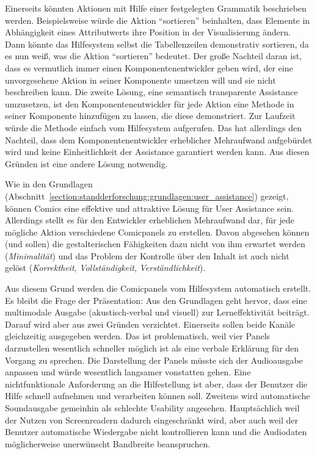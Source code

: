 \documentclass[
	headsepline,
	footsepline,
	fontsize=12pt,
	bibliography=totoc
]{scrbook}
\begin{document}
Einerseits könnten Aktionen mit Hilfe einer festgelegten Grammatik beschrieben werden. Beispielsweise würde die Aktion \enquote{sortieren} beinhalten, dass Elemente in Abhängigkeit eines Attributwerts ihre Position in der Visualisierung ändern. Dann könnte das Hilfesystem selbst die Tabellenzeilen demonstrativ sortieren, da es nun weiß, was die Aktion \enquote{sortieren} bedeutet. Der große Nachteil daran ist, dass es vermutlich immer einen Komponentenentwickler geben wird, der eine unvorgesehene Aktion in seiner Komponente umsetzen will und sie nicht beschreiben kann. Die zweite Lösung, eine semantisch transparente Assistance umzusetzen, ist den Komponentenentwickler für jede Aktion eine Methode in seiner Komponente hinzufügen zu lassen, die diese demonstriert. Zur Laufzeit würde die Methode einfach vom Hilfesystem aufgerufen. Das hat allerdings den Nachteil, dass dem Komponentenentwickler erheblicher Mehraufwand aufgebürdet wird und keine Einheitlichkeit der Assistance garantiert werden kann. Aus diesen Gründen ist eine andere Lösung notwendig.

Wie in den Grundlagen (Abschnitt~\ref{section:standderforschung:grundlagen:user_assistance}) gezeigt, können Comics eine effektive und attraktive Lösung für User Assistance sein. Allerdings stellt es für den Entwickler erheblichen Mehraufwand dar, für jede mögliche Aktion verschiedene Comicpanels zu erstellen. Davon abgesehen können (und sollen) die gestalterischen Fähigkeiten dazu nicht von ihm erwartet werden (\emph{Minimalität}) und das Problem der Kontrolle über den Inhalt ist auch nicht gelöst (\emph{Korrektheit}, \emph{Vollständigkeit}, \emph{Verständlichkeit}).

Aus diesem Grund werden die Comicpanels vom Hilfesystem automatisch erstellt. Es bleibt die Frage der Präsentation: Aus den Grundlagen geht hervor, dass eine multimodale Ausgabe (akustisch-verbal und visuell) zur Lerneffektivität beiträgt. Darauf wird aber aus zwei Gründen verzichtet. Einerseits sollen beide Kanäle gleichzeitig ausgegeben werden. Das ist problematisch, weil vier Panels darzustellen wesentlich schneller möglich ist als eine verbale Erklärung für den Vorgang zu sprechen. Die Darstellung der Panels müsste sich der Audioausgabe anpassen und würde wesentlich langsamer vonstatten gehen. Eine nichtfunktionale Anforderung an die Hilfestellung ist aber, dass der Benutzer die Hilfe schnell aufnehmen und verarbeiten können soll. Zweitens wird automatische Soundausgabe gemeinhin als schlechte Usability angesehen. Hauptsächlich weil der Nutzen von Screenreadern dadurch eingeschränkt wird, aber auch weil der Benutzer automatische Wiedergabe nicht kontrollieren kann und die Audiodaten möglicherweise unerwünscht Bandbreite beanspruchen.
\end{document}
